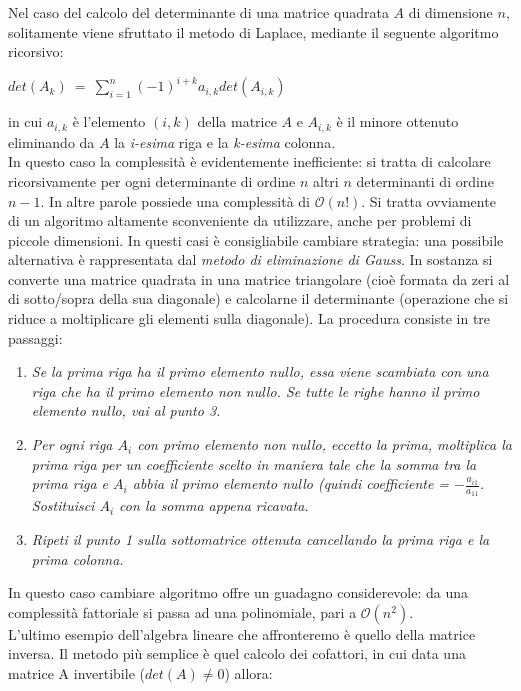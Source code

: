 Nel caso del calcolo del determinante di una matrice quadrata $A$ di dimensione $n$, solitamente viene sfruttato il metodo di Laplace, mediante il seguente algoritmo ricorsivo:
\begin{center}
{$det(A_k) \ = \ \sum\limits_{i=1}^n (-1)^{i+k} a_{i,k} det(A_{i,k})$}
\end{center}
in cui $a_{i,k}$ è l'elemento $(i,k)$ della matrice $A$ e $A_{i,k}$ è il minore ottenuto eliminando da $A$ la \textit{i-esima} riga e la \textit{k-esima} colonna.\\
In questo caso la complessità è evidentemente inefficiente: si tratta di calcolare ricorsivamente per ogni determinante di ordine $n$ altri $n$ determinanti di ordine $n-1$. In altre parole possiede una complessità di $\mathcal {O}(n!)$. Si tratta ovviamente di un algoritmo altamente sconveniente da utilizzare, anche per problemi di piccole dimensioni. In questi casi è consigliabile cambiare strategia: una possibile alternativa è rappresentata dal \textit{metodo di eliminazione di Gauss}. In sostanza si converte una matrice quadrata in una matrice triangolare (cioè formata da zeri al di sotto/sopra della sua diagonale) e calcolarne il determinante (operazione che si riduce a moltiplicare gli elementi sulla diagonale). La procedura consiste in tre passaggi:
\begin{enumerate}
\item{\textit{Se la prima riga ha il primo elemento nullo, essa viene scambiata con una riga che ha il primo elemento non nullo. Se tutte le righe hanno il primo elemento nullo, vai al punto 3.\\}}
\item{\textit{Per ogni riga $A_{i}$ con primo elemento non nullo, eccetto la prima, moltiplica la prima riga per un coefficiente scelto in maniera tale che la somma tra la prima riga e $A_{i}$ abbia il primo elemento nullo (quindi coefficiente = $-\frac{a_{i1}}{a_{11}}$. Sostituisci $A_{i}$ con la somma appena ricavata.\\}}
\item{\textit{Ripeti il punto 1 sulla sottomatrice ottenuta cancellando la prima riga e la prima colonna.}}
\\
\end{enumerate}
In questo caso cambiare algoritmo offre un guadagno considerevole: da una complessità fattoriale si passa ad una polinomiale, pari a $\mathcal{O}(n^2)$.\\
L'ultimo esempio dell'algebra lineare che affronteremo è quello della matrice inversa. Il metodo più semplice è quel calcolo dei cofattori, in cui data una matrice A invertibile ($det(A) \neq 0$) allora:
